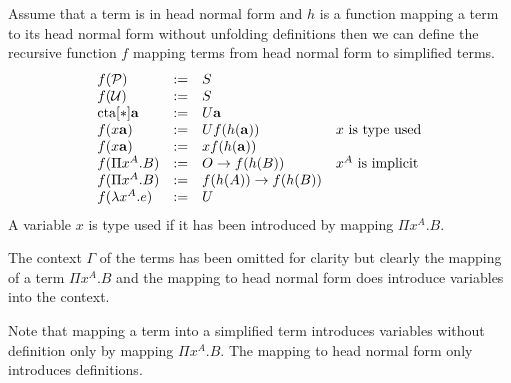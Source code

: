 Assume that a term is in head normal form and $h$ is a function mapping a term
to its head normal form without unfolding definitions then we can define the
recursive function $f$ mapping terms from head normal form to simplified terms.
$$
\begin{array}{lllll} 
    f({\cal P}) &:=& S
    \\
    f({\cal U})  &:=& S
    \\
    {\text{cta}}[*] {\mathbf a} &:=& U {\mathbf a}
    \\
    f(x {\mathbf a})  &:=& U f(h({\mathbf a}))
    &\text{$x$ is type used}
    \\
    f(x {\mathbf a})  &:=& x f(h({\mathbf a}))
    \\
    f(\Pi x^A.B) &:=& O \to f(h(B)) & \text{$x^A$ is implicit}
    \\
    f(\Pi x^A.B)
    &:=&
    f(h(A)) \to f(h(B))
    \\
    f(\lambda x^A.e) &:=& U
 \end{array}
$$
A variable $x$ is type used if it has been introduced by mapping $\Pi x^A.B$.

The context $\Gamma$ of the terms has been omitted for clarity but clearly the
mapping of a term $\Pi x^A.B$ and the mapping to head normal form does introduce
variables into the context.

Note that mapping a term into a simplified term introduces variables without
definition only by mapping $\Pi x^A.B$. The mapping to head normal form only
introduces definitions.

